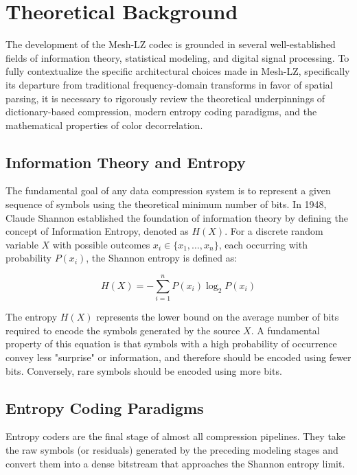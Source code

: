 \chapter{Theoretical Background}
\label{ch:background}

The development of the Mesh-LZ codec is grounded in several well-established fields of information theory, statistical modeling, and digital signal processing. To fully contextualize the specific architectural choices made in Mesh-LZ, specifically its departure from traditional frequency-domain transforms in favor of spatial parsing, it is necessary to rigorously review the theoretical underpinnings of dictionary-based compression, modern entropy coding paradigms, and the mathematical properties of color decorrelation.

\section{Information Theory and Entropy}

The fundamental goal of any data compression system is to represent a given sequence of symbols using the theoretical minimum number of bits. In 1948, Claude Shannon established the foundation of information theory by defining the concept of Information Entropy, denoted as $H(X)$. For a discrete random variable $X$ with possible outcomes $x_i \in \{x_1, \dots, x_n\}$, each occurring with probability $P(x_i)$, the Shannon entropy is defined as:

\begin{equation}
    H(X) = - \sum_{i=1}^{n} P(x_i) \log_2 P(x_i)
\end{equation}

The entropy $H(X)$ represents the lower bound on the average number of bits required to encode the symbols generated by the source $X$. A fundamental property of this equation is that symbols with a high probability of occurrence convey less "surprise" or information, and therefore should be encoded using fewer bits. Conversely, rare symbols should be encoded using more bits.

\section{Entropy Coding Paradigms}

Entropy coders are the final stage of almost all compression pipelines. They take the raw symbols (or residuals) generated by the preceding modeling stages and convert them into a dense bitstream that approaches the Shannon entropy limit.

